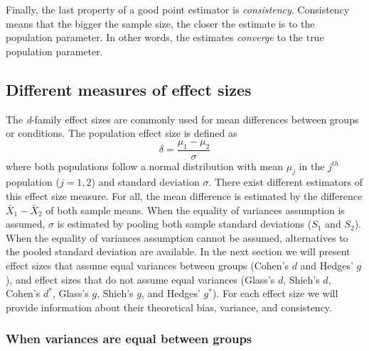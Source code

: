 \documentclass[
  english,
  man]{apa6}
\begin{document}
Finally, the last property of a good point estimator is \emph{consistency}. Consistency means that the bigger the sample size, the closer the estimate is to the population parameter. In other words, the estimates \emph{converge} to the true population parameter.

\hypertarget{different-measures-of-effect-sizes}{%
\subsection{Different measures of effect sizes}\label{different-measures-of-effect-sizes}}

The \emph{d}-family effect sizes are commonly used for mean differences between groups or conditions. The population effect size is defined as
\begin{equation} 
\delta = \frac{\mu_{1}-\mu_{2}}{\sigma} 
\label{eqn:Cohendelta}
\end{equation}
where both populations follow a normal distribution with mean \(\mu_j\) in the \(j^{th}\) population (\(j=1,2\)) and standard deviation \(\sigma\). There exist different estimators of this effect size measure. For all, the mean difference is estimated by the difference \(\bar{X}_1-\bar{X}_2\) of both sample means. When the equality of variances assumption is assumed, \(\sigma\) is estimated by pooling both sample standard deviations (\(S_1\) and \(S_2\)). When the equality of variances assumption cannot be assumed, alternatives to the pooled standard deviation are available. In the next section we will present effect sizes that assume equal variances between groups (Cohen's \(d\) and Hedges' \(g\)), and effect sizes that do not assume equal variances (Glass's \(d\), Shieh's \(d\), Cohen's \(d^*\), Glass's \(g\), Shieh's \(g\), and Hedges' \(g^*\)). For each effect size we will provide information about their theoretical bias, variance, and consistency.

\hypertarget{when-variances-are-equal-between-groups}{%
\subsubsection{When variances are equal between groups}\label{when-variances-are-equal-between-groups}}
\end{document}
